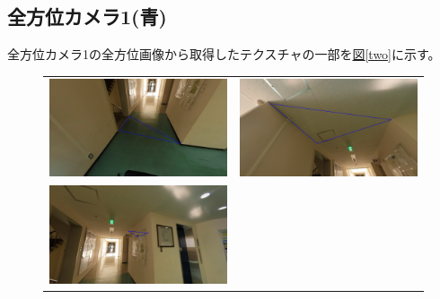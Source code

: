 \documentclass[]{jarticle}          %
\begin{document}
\subsection{全方位カメラ1(青)}
全方位カメラ1の全方位画像から取得したテクスチャの一部を\hyperref[two]{図\ref{two}}に示す。
\begin{figure}[H]
  \begin{center}
    \begin{tabular}{cc}
      \includegraphics[keepaspectratio, scale=0.08]{figures/texture0/texture_0_0.png}&
      \includegraphics[keepaspectratio, scale=0.08]{figures/texture0/texture_0_5.png}\\
      \includegraphics[keepaspectratio, scale=0.08]{figures/texture0/texture_0_10.png}&

\end{tabular}
\end{center}
\end{figure}
\end{document}
